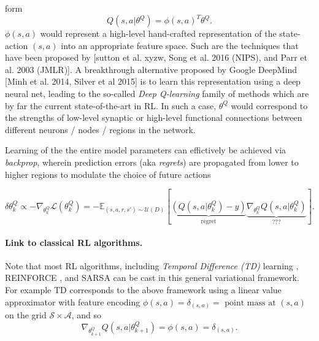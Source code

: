 \documentclass[10pt,letterpaper]{article}
\begin{document}
form
$${Q}(s, a|\theta^Q) = \phi(s,a)^T\theta^Q.$$
$\phi(s,a)$ would represent a high-level hand-crafted representation of the state-action $(s,a)$ into an appropriate
feature space. Such are the techniques that have been proposed by [sutton et al. xyzw, Song et al. 2016 (NIPS),
  and Parr et al. 2003 (JMLR)].
A breakthrough alternative proposed by Google DeepMind [Minh et al. 2014, Silver et al 2015] is to learn this
representation using a deep neural net, leading to the so-called \textit{Deep Q-learning} family of methods which
are by far the current state-of-the-art in RL. In such a case, $\theta^Q$
would correspond to the strengths of low-level synaptic or high-level functional connections between different
neurons / nodes / regions in the network.

Learning of the the entire model parameters can effictively be achieved via \textit{backprop},
wherein prediction errors (aka \textit{regrets})  are propagated from lower to higher regions to modulate the choice of future actions

\begin{equation}
  \delta \theta_{k}^Q \propto -\nabla_{\theta^Q_{k}}\mathcal L(\theta^Q_{k})
  = -\mathbb E_{(s, a, r, s') \sim \mathcal U(D)}\left[\underbrace{(Q(s, a|\theta^Q_{k}) - y)}_{\text{regret}}
    \underbrace{\nabla_{\theta^Q_{k}}Q(s, a|\theta^Q_{k})}_{\text{???}}\right].
  \label{eq:oracle}
\end{equation}

\paragraph{Link to classical RL algorithms.}
Note that most RL algorithms, including \textit{Temporal Difference (TD)}
learning \cite{sutton1998reinforcement}, REINFORCE \cite{williams1992}, and SARSA can be
cast in this general variational framework. For example TD corresponds to
the above framework using a linear value approximator with feature encoding
$\phi(s,a) = \delta_{(s,a)} =  \text{ point mass at }(s,a)$ on the grid
$\mathcal S \times \mathcal A$, and so
$$\nabla_{\theta^Q_{k+1}}Q(s, a|\theta^Q_{k+1}) = \phi(s, a) = \delta_{(s,a)}.$$
\end{document}
